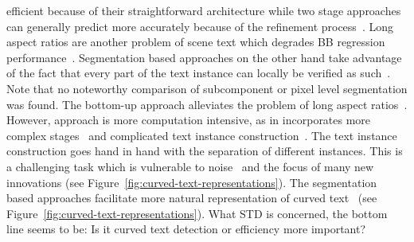 efficient  because of their straightforward architecture while two stage approaches can generally
predict more accurately  because of the refinement process~\citep{lu_mimicdet_2020}.
Long aspect ratios are another problem of scene text which degrades \ac{BB} regression
performance~\citep{shi_detecting_2017,long_scene_2021}.
Segmentation based approaches on the other hand take advantage of the fact that every part of the
text instance can locally be verified as such~\citep{long_scene_2021}.
Note that no noteworthy comparison of subcomponent or pixel level segmentation was found.
The bottom-up approach alleviates the problem of long aspect ratios~\citep{shi_detecting_2017}.
However, approach is more computation intensive, as in incorporates more complex
stages~\citep{dai_fused_2018} and complicated text instance
construction~\citep{xie_aggregation_2019,liao_real-time_2019,dai_fused_2018}.
The text instance construction goes hand in hand with the separation of different instances.
This is a challenging task which is vulnerable to noise~\citep{long_scene_2021} and the focus of
many new innovations (see Figure~\ref{fig:curved-text-representations}).
The segmentation based approaches facilitate more natural representation of curved
text~\citep{dai_fused_2018,long_scene_2021} (see Figure~\ref{fig:curved-text-representations}).
What \ac{STD} is concerned, the bottom line seems to be: Is it curved text detection or efficiency
more important?

